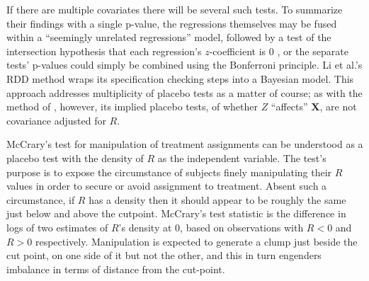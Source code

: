If there are multiple
covariates there will be several such tests. To summarize their
findings with a single p-value, the
regressions themselves may be fused within a
``seemingly unrelated regressions'' model, followed by a test of the
intersection hypothesis that each regression's $z$-coefficient is 0
\citep{lee2010regression}, or the
separate tests' p-values could simply be combined using the Bonferroni
principle.  Li et al.'s
\citeyearpar{liMatteiMealli2015BayesianRD} RDD method wraps
its specification checking steps into a Bayesian model. %
This approach addresses multiplicity of placebo tests as a matter of course; as with the method of \citet{cattaneo2014randomization}, however, its implied placebo tests, of whether $Z$ ``affects'' $\mathbf{X}$, are not covariance adjusted for $R$.


McCrary's test for manipulation of treatment assignments
\citeyearpar{mccrary2008manipulation} can be understood as a %
placebo test with the density of $R$ as the independent variable.
The test's
purpose is to expose the circumstance of subjects finely manipulating their
$R$ values in order to secure or avoid assignment to treatment.  Absent
such a circumstance, if $R$ has a density then it should appear to be
roughly the same just below and above the cutpoint.  McCrary's
\citeyearpar{mccrary2008manipulation} test statistic is the difference
in logs of two estimates of $R$'s density at 0, based on observations
with $R<0$ and $R>0$ respectively.
Manipulation is expected to generate a clump just beside the cut
point, on one side of it but not the other, and this in turn engenders
imbalance in terms of distance from the cut-point.


